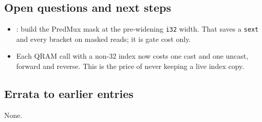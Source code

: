 \subsection*{Open questions and next steps}
\begin{itemize}
  \item {}: build the PredMux mask at the
  pre-widening \texttt{i32} width. That saves a \texttt{sext} and every bracket
  on masked reads; it is gate cost only.
  \item Each QRAM call with a non-32 index now costs one cast and one uncast,
  forward and reverse. This is the price of never keeping a live index copy.
\end{itemize}

\subsection*{Errata to earlier entries}
None.
